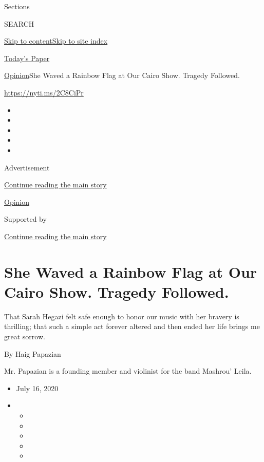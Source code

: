 Sections

SEARCH

\protect\hyperlink{site-content}{Skip to
content}\protect\hyperlink{site-index}{Skip to site index}

\href{https://myaccount.nytimes.com/auth/login?response_type=cookie\&client_id=vi}{}

\href{https://www.nytimes.com/section/todayspaper}{Today's Paper}

\href{/section/opinion}{Opinion}\textbar{}She Waved a Rainbow Flag at
Our Cairo Show. Tragedy Followed.

\href{https://nyti.ms/2C8CiPr}{https://nyti.ms/2C8CiPr}

\begin{itemize}
\item
\item
\item
\item
\item
\end{itemize}

Advertisement

\protect\hyperlink{after-top}{Continue reading the main story}

\href{/section/opinion}{Opinion}

Supported by

\protect\hyperlink{after-sponsor}{Continue reading the main story}

\hypertarget{she-waved-a-rainbow-flag-at-our-cairo-show-tragedy-followed}{%
\section{She Waved a Rainbow Flag at Our Cairo Show. Tragedy
Followed.}\label{she-waved-a-rainbow-flag-at-our-cairo-show-tragedy-followed}}

That Sarah Hegazi felt safe enough to honor our music with her bravery
is thrilling; that such a simple act forever altered and then ended her
life brings me great sorrow.

By Haig Papazian

Mr. Papazian is a founding member and violinist for the band Mashrou'
Leila.

\begin{itemize}
\item
  July 16, 2020
\item
  \begin{itemize}
  \item
  \item
  \item
  \item
  \item
  \end{itemize}
\end{itemize}

